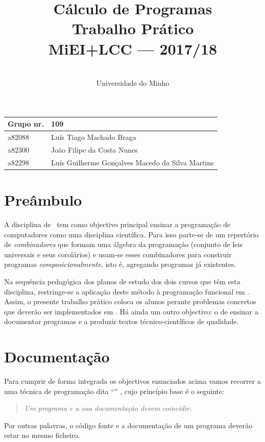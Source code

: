 \documentclass[a4paper]{article}
\title{
            Cálculo de Programas
\\
        Trabalho Prático
\\
        MiEI+LCC --- 2017/18
}
\author{
        \dium
\\
        Universidade do Minho
}
\date\mydate
\begin{document}
\maketitle

\begin{center}\large
\begin{tabular}{ll}
\textbf{Grupo} nr. & 109
\\\hline
a82088 & Luís Tiago Machado Braga
\\
a82300 & João Filipe da Costa Nunes
\\
a82298 & Luís Guilherme Gonçalves Macedo da Silva Martins
\end{tabular}
\end{center}

\section{Preâmbulo}

A disciplina de \CP\ tem como objectivo principal ensinar
a progra\-mação de computadores como uma disciplina científica. Para isso
parte-se de um repertório de \emph{combinadores} que formam uma álgebra da
programação (conjunto de leis universais e seus corolários) e usam-se esses
combinadores para construir programas \emph{composicionalmente}, isto é,
agregando programas já existentes.
  
Na sequência pedagógica dos planos de estudo dos dois cursos que têm esta
disciplina, restringe-se a aplicação deste método à programação funcional
em \Haskell. Assim, 
o presente trabalho prático coloca os alunos perante problemas
concretos que deverão ser implementados em \Haskell.
Há ainda um outro objectivo: o de ensinar a documentar programas e
a produzir textos técnico-científicos de qualidade.

\section{Documentação}
Para cumprir de forma integrada os objectivos enunciados acima vamos recorrer
a uma técnica de programa\-ção dita ``'' \cite{Kn92}, cujo
princípio base é o seguinte:
\begin{quote}\em
Um programa e a sua documentação devem coincidir.
\end{quote}
Por outras palavras, o código fonte e a documentação de um programa deverão estar no
mesmo ficheiro.
\end{document}

